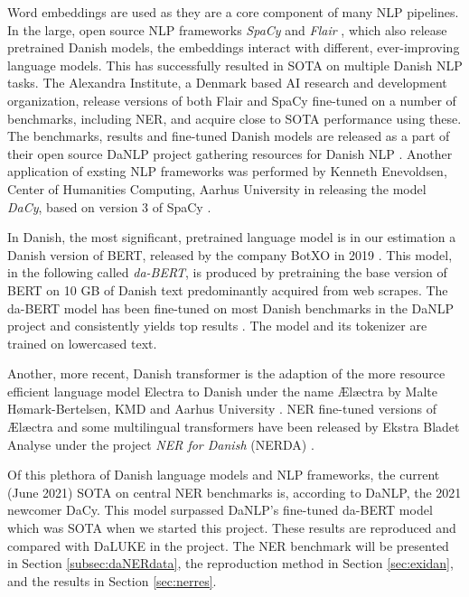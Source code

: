 \documentclass[main.tex]{subfiles}
\begin{document}
Word embeddings are used as they are a core component of many NLP pipelines.
In the large, open source NLP frameworks \emph{SpaCy} \cite{honnibal2020spacy} and \emph{Flair} \cite{akbik2019flair}, which also release pretrained Danish models, the embeddings interact with different, ever-improving language models.
This has successfully resulted in SOTA on multiple Danish NLP tasks.
The Alexandra Institute, a Denmark based AI research and development organization, release versions of both Flair and SpaCy fine-tuned on a number of benchmarks, including NER, and acquire close to SOTA performance using these.
The benchmarks, results and fine-tuned Danish models are released as a part of their open source DaNLP project gathering resources for Danish NLP \cite{danlp2021}.
Another application of exsting NLP frameworks was performed by Kenneth Enevoldsen, Center of Humanities Computing, Aarhus University in releasing the model \emph{DaCy}, based on version 3 of SpaCy \cite{enevoldsen2020dacy}.

In Danish, the most significant, pretrained language model is in our estimation a Danish version of BERT, released by the company BotXO in 2019 \cite{botxo2019dabert}.
This model, in the following called \emph{da-BERT}, is produced by pretraining the base version of BERT \cite{devlin2019bert} on 10 GB of Danish text predominantly acquired from web scrapes.
The da-BERT model has been fine-tuned on most Danish benchmarks in the DaNLP project and consistently yields top results \cite{danlp2021, hvingelby2020dane}.
The model and its tokenizer are trained on lowercased text.

Another, more recent, Danish transformer is the adaption of the more resource efficient language model Electra to Danish under the name Ælæctra by Malte Hømark-Bertelsen, KMD and Aarhus University \cite{bertelsen2020lctra}.
NER fine-tuned versions of Ælæctra and some multilingual transformers have been released by Ekstra Bladet Analyse under the project \emph{NER for Danish} (NERDA) \cite{kjeldgaard2020nerda}.

Of this plethora of Danish language models and NLP frameworks, the current (June 2021) SOTA on central NER benchmarks is, according to DaNLP, the 2021 newcomer DaCy.
This model surpassed DaNLP's fine-tuned da-BERT model which was SOTA when we started this project\footnotemark.
These results are reproduced and compared with DaLUKE in the project.
The NER benchmark will be presented in Section \ref{subsec:daNERdata}, the reproduction method in Section \ref{sec:exidan}, and the results in Section \ref{sec:nerres}.
\end{document}
